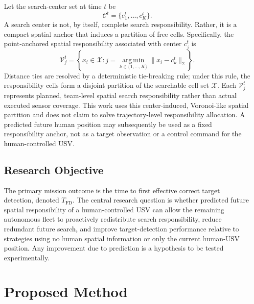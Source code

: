 \documentclass[letterpaper, 10pt, conference]{ieeeconf}
\begin{document}
Let the search-center set at time \(t\) be
\begin{equation}
  \mathcal{C}^t = \{c_1^t, \ldots, c_K^t\}.
  \label{eq:search_centers}
\end{equation}
A search center is not, by itself, complete search responsibility. Rather, it is a compact spatial anchor that induces a partition of free cells. Specifically, the point-anchored spatial responsibility associated with center \(c_j^t\) is
\begin{equation}
  \mathcal{V}_j^t = \left\{x_i \in \mathcal{X} :
  j = \operatorname*{arg\,min}_{k \in \{1,\ldots,K\}}
  \lVert x_i - c_k^t \rVert_2\right\}.
  \label{eq:responsibility_partition}
\end{equation}
Distance ties are resolved by a deterministic tie-breaking rule; under this rule, the responsibility cells form a disjoint partition of the searchable cell set \(\mathcal{X}\). Each \(\mathcal{V}_j^t\) represents planned, team-level spatial search responsibility rather than actual executed sensor coverage. This work uses this center-induced, Voronoi-like spatial partition and does not claim to solve trajectory-level responsibility allocation. A predicted future human position may subsequently be used as a fixed responsibility anchor, not as a target observation or a control command for the human-controlled USV.

\subsection{Research Objective}

The primary mission outcome is the time to first effective correct target detection, denoted \(T_{\mathrm{FD}}\).
The central research question is whether predicted future spatial responsibility of a human-controlled USV can allow the remaining autonomous fleet to proactively redistribute search responsibility, reduce redundant future search, and improve target-detection performance relative to strategies using no human spatial information or only the current human-USV position. Any improvement due to prediction is a hypothesis to be tested experimentally.

\section{Proposed Method}
\end{document}
